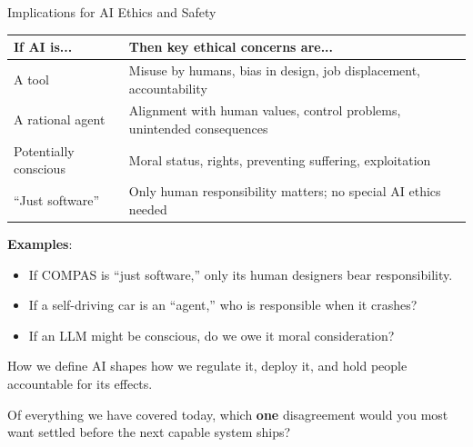 ﻿\documentclass[aspectratio=169,11pt]{beamer}
\begin{document}
\begin{frame}{Implications for AI Ethics and Safety}
\begin{table}[h]
\centering
\scriptsize
\begin{tabular}{@{}p{3.5cm}p{8.5cm}@{}}
\toprule
\textbf{If AI is...} & \textbf{Then key ethical concerns are...} \\
\midrule
A tool & Misuse by humans, bias in design, job displacement, accountability \\
\addlinespace
A rational agent & Alignment with human values, control problems, unintended consequences \\
\addlinespace
Potentially conscious & Moral status, rights, preventing suffering, exploitation \\
\addlinespace
``Just software'' & Only human responsibility matters; no special AI ethics needed \\
\bottomrule
\end{tabular}
\end{table}

\vspace{0.2em}
\textbf{Examples}:
\begin{itemize}
    \item If COMPAS is ``just software,'' only its human designers bear responsibility.
    \item If a self-driving car is an ``agent,'' who is responsible when it crashes?
    \item If an LLM might be conscious, do we owe it moral consideration?
\end{itemize}

\vspace{0.1em}
How we define AI shapes how we regulate it, deploy it, and hold people accountable for its effects.

\begin{discussionbox}[Discussion]
Of everything we have covered today, which \textbf{one} disagreement would you most want settled before the next capable system ships?
\end{discussionbox}
\end{frame}
\end{document}
